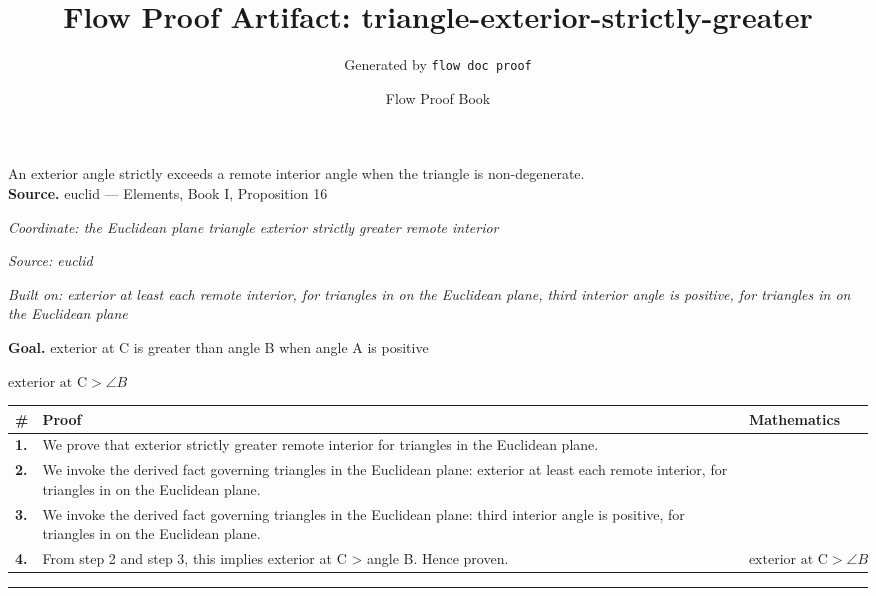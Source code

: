 \documentclass[11pt]{article}
\title{Flow Proof Artifact: triangle-exterior-strictly-greater}
\author{Generated by \texttt{flow doc proof}}
\date{Flow Proof Book}
\theoremstyle{definition}
\begin{document}
\maketitle
An exterior angle strictly exceeds a remote interior angle when the triangle is non-degenerate.\\[0.5em]
\textbf{Source.} euclid — Elements, Book I, Proposition 16\\[0.5em]
\bigskip
{}\par
\smallskip\noindent\textit{Coordinate: the Euclidean plane \cdot triangle \cdot exterior strictly greater remote interior}\par
\smallskip\noindent\textit{Source: euclid}\par
\smallskip\noindent\textit{Built on: exterior at least each remote interior, for triangles in on the Euclidean plane, third interior angle is positive, for triangles in on the Euclidean plane}\par
\medskip
\noindent\textbf{Goal.} exterior at C is greater than angle B when angle A is positive\par
\noindent$\displaystyle \text{exterior at C} > \angle B$\par
\medskip
\noindent
\begin{tabular}{@{} >{\raggedright\arraybackslash}p{} >{\raggedright\arraybackslash}p{} >{\raggedleft\arraybackslash}p{} @{}}
\textbf{\#} & \textbf{Proof} & \textbf{Mathematics} \\
\midrule
\textbf{1.} & We prove that exterior strictly greater remote interior for triangles in the Euclidean plane. & \\[0.45em]
\textbf{2.} & We invoke the derived fact governing triangles in the Euclidean plane: exterior at least each remote interior, for triangles in on the Euclidean plane. & \\[0.45em]
\textbf{3.} & We invoke the derived fact governing triangles in the Euclidean plane: third interior angle is positive, for triangles in on the Euclidean plane. & \\[0.45em]
\textbf{4.} & From step 2 and step 3, this implies exterior at C > angle B. Hence proven. & $\displaystyle \text{exterior at C} > \angle B$ \\[0.45em]
\bottomrule
\end{tabular}
\label{thm:Geometry-triangle-exterior_strictly_greater_remote_interior}
\par\medskip\hrule
\end{document}
